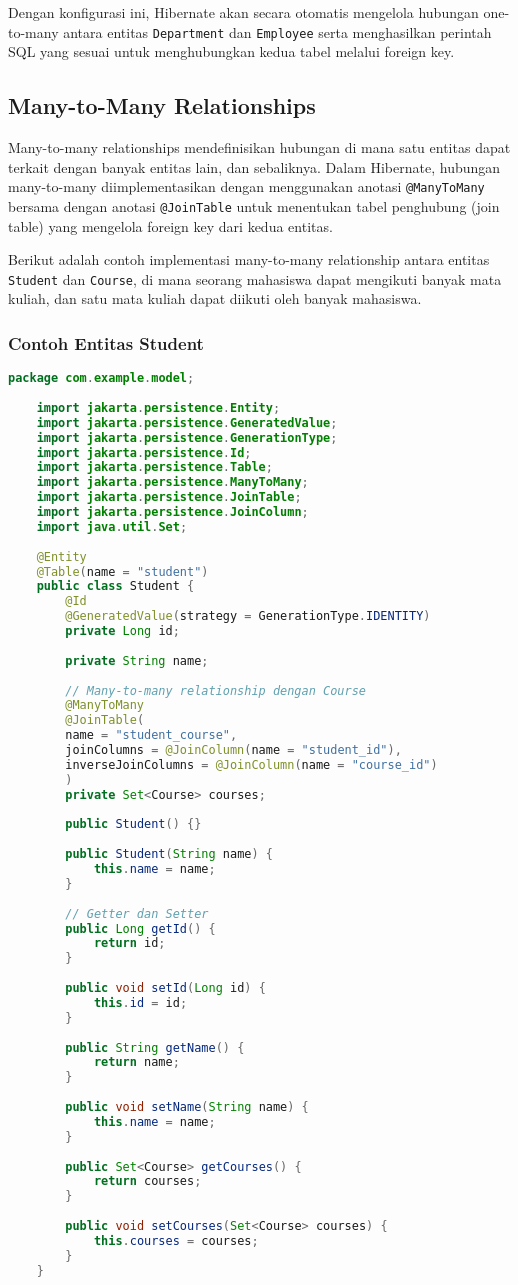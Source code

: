 Dengan konfigurasi ini, Hibernate akan secara otomatis mengelola hubungan one-to-many antara entitas \texttt{Department} dan \texttt{Employee} serta menghasilkan perintah SQL yang sesuai untuk menghubungkan kedua tabel melalui foreign key.


\subsection{Many-to-Many Relationships}

Many-to-many relationships mendefinisikan hubungan di mana satu entitas dapat terkait dengan banyak entitas lain, dan sebaliknya. Dalam Hibernate, hubungan many-to-many diimplementasikan dengan menggunakan anotasi \texttt{@ManyToMany} bersama dengan anotasi \texttt{@JoinTable} untuk menentukan tabel penghubung (join table) yang mengelola foreign key dari kedua entitas.

Berikut adalah contoh implementasi many-to-many relationship antara entitas \texttt{Student} dan \texttt{Course}, di mana seorang mahasiswa dapat mengikuti banyak mata kuliah, dan satu mata kuliah dapat diikuti oleh banyak mahasiswa.

\subsubsection*{Contoh Entitas Student}
\begin{lstlisting}[language=Java, style=JavaStyle]
	package com.example.model;
	
	import jakarta.persistence.Entity;
	import jakarta.persistence.GeneratedValue;
	import jakarta.persistence.GenerationType;
	import jakarta.persistence.Id;
	import jakarta.persistence.Table;
	import jakarta.persistence.ManyToMany;
	import jakarta.persistence.JoinTable;
	import jakarta.persistence.JoinColumn;
	import java.util.Set;
	
	@Entity
	@Table(name = "student")
	public class Student {
		@Id
		@GeneratedValue(strategy = GenerationType.IDENTITY)
		private Long id;
		
		private String name;
		
		// Many-to-many relationship dengan Course
		@ManyToMany
		@JoinTable(
		name = "student_course",
		joinColumns = @JoinColumn(name = "student_id"),
		inverseJoinColumns = @JoinColumn(name = "course_id")
		)
		private Set<Course> courses;
		
		public Student() {}
		
		public Student(String name) {
			this.name = name;
		}
		
		// Getter dan Setter
		public Long getId() {
			return id;
		}
		
		public void setId(Long id) {
			this.id = id;
		}
		
		public String getName() {
			return name;
		}
		
		public void setName(String name) {
			this.name = name;
		}
		
		public Set<Course> getCourses() {
			return courses;
		}
		
		public void setCourses(Set<Course> courses) {
			this.courses = courses;
		}
	}
\end{lstlisting}

